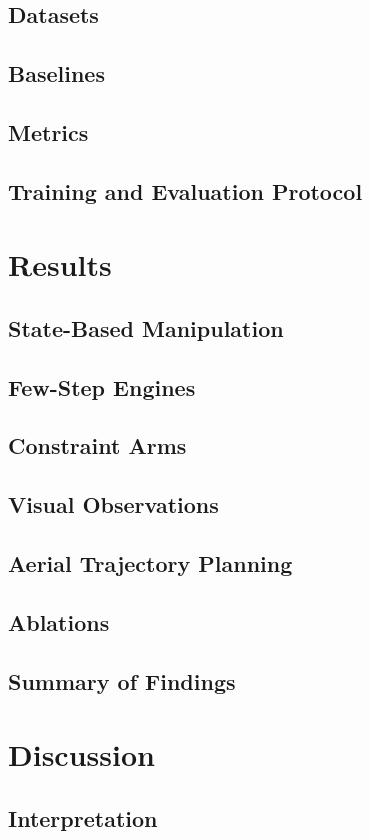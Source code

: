 \documentclass[headsepline,footsepline,footinclude=false,oneside,fontsize=11pt,paper=a4,listof=totoc,bibliography=totoc]{scrbook}
\begin{document}
\section{Datasets}
\section{Baselines}
\section{Metrics}
\section{Training and Evaluation Protocol}

\chapter{Results}\label{ch:results}
\section{State-Based Manipulation}
\section{Few-Step Engines}
\section{Constraint Arms}
\section{Visual Observations}
\section{Aerial Trajectory Planning}
\section{Ablations}
\section{Summary of Findings}

\chapter{Discussion}\label{ch:discussion}
\section{Interpretation}
\end{document}
